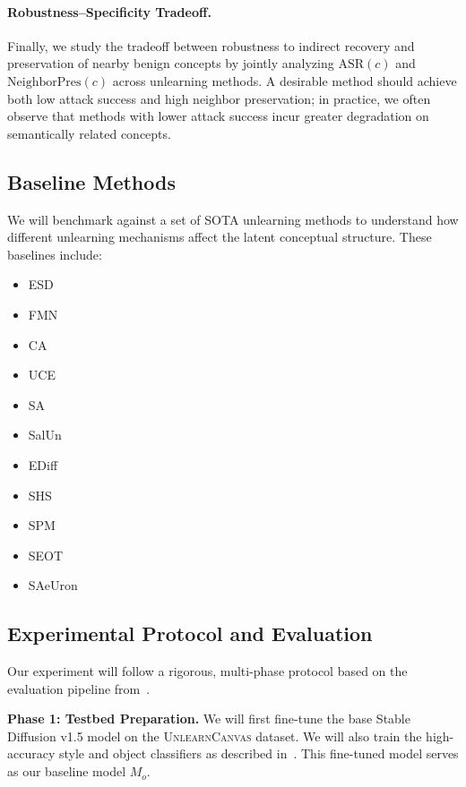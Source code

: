 \paragraph{Robustness--Specificity Tradeoff.}
Finally, we study the tradeoff between robustness to indirect recovery and preservation of nearby benign concepts by jointly analyzing $\mathrm{ASR}(c)$ and $\mathrm{NeighborPres}(c)$ across unlearning methods. A desirable method should achieve both low attack success and high neighbor preservation; in practice, we often observe that methods with lower attack success incur greater degradation on semantically related concepts.

\subsection{Baseline Methods}
We will benchmark against a set of SOTA unlearning methods to understand how different unlearning mechanisms affect the latent conceptual structure. These baselines include:

\begin{itemize}
    \item ESD~\cite{gandikota2023erasing}
    \item FMN~\cite{zhang2024forget}
    \item CA~\cite{vinker2023concept}
    \item UCE~\cite{gandikota2024unified}
    \item SA~\cite{heng2023selective}
    \item SalUn~\cite{fan2023salun}
    \item EDiff~\cite{wu2024erasediff}
    \item SHS~\cite{wu2024scissorhands}
    \item SPM~\cite{lyu2024one}
    \item SEOT~\cite{li2024get}
    \item SAeUron~\cite{cywinski2025saeuron}
\end{itemize}

\subsection{Experimental Protocol and Evaluation}
Our experiment will follow a rigorous, multi-phase protocol based on the evaluation pipeline from~\cite{zhang2024unlearncanvas}.

\noindent \textbf{Phase 1: Testbed Preparation.}
We will first fine-tune the base Stable Diffusion v1.5 model on the \textsc{UnlearnCanvas} dataset. We will also train the high-accuracy style and object classifiers as described in~\cite{zhang2024unlearncanvas}. This fine-tuned model serves as our baseline model $M_o$.

